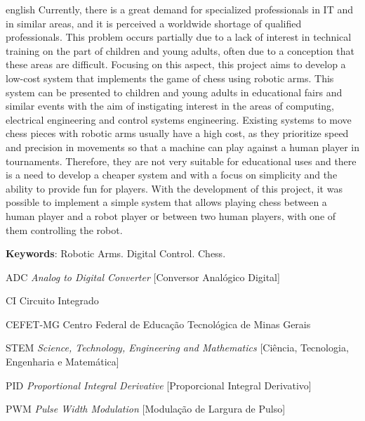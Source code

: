 \begin{resumo}[Abstract]
 \begin{otherlanguage*}{english}
  Currently, there is a great demand for specialized professionals in IT and in similar areas, and it is perceived a worldwide shortage of qualified professionals.
  This problem occurs partially due to a lack of interest in technical training on the part of children and young adults, often due to a conception that these areas are difficult.
  Focusing on this aspect, this project aims to develop a low-cost system that implements the game of chess using robotic arms.
  This system can be presented to children and young adults in educational fairs and similar events with the aim of instigating interest in the areas of computing, electrical engineering and control systems engineering.
  Existing systems to move chess pieces with robotic arms usually have a high cost, as they prioritize speed and precision in movements so that a machine can play against a human player in tournaments.
  Therefore, they are not very suitable for educational uses and there is a need to develop a cheaper system and with a focus on simplicity and the ability to provide fun for players.
  With the development of this project, it was possible to implement a simple system that allows playing chess between a human player and a robot player or between two human players, with one of them controlling the robot.

   \vspace{\onelineskip} 
   \noindent 
   \textbf{Keywords}: Robotic Arms. Digital Control. Chess.
 \end{otherlanguage*}
\end{resumo}



\listoffigures*
\cleardoublepage

\listoftables*
\cleardoublepage

\begin{siglas}
  \item[ADC] \textit{Analog to Digital Converter} [Conversor Analógico Digital]
  \item[CI] Circuito Integrado
  \item[CEFET-MG] Centro Federal de Educação Tecnológica de Minas Gerais
  \item[STEM] \textit{Science, Technology, Engineering and Mathematics} [Ciência, Tecnologia, Engenharia e Matemática]
  \item[PID] \textit{Proportional Integral Derivative} [Proporcional Integral Derivativo]
  \item[PWM] \textit{Pulse Width Modulation} [Modulação de Largura de Pulso]
\end{siglas}

